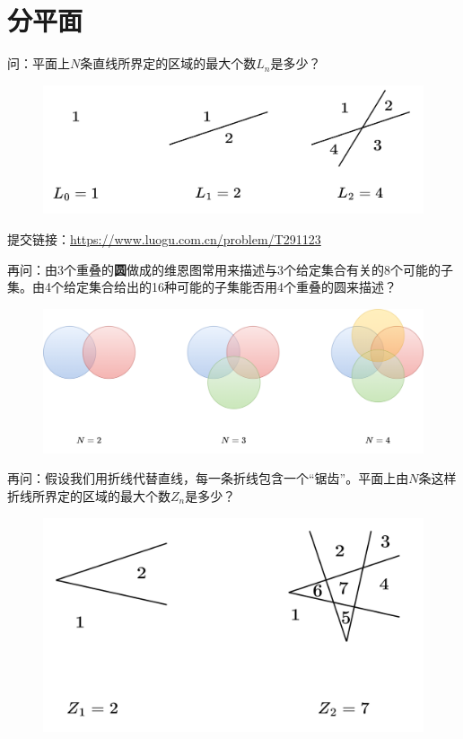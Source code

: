 \documentclass[12pt]{ctexart}
\begin{document}
\newpage
\section{分平面}
问：平面上$N$条直线所界定的区域的最大个数$L_n$是多少？

\begin{figure}[htbp]
    \centering
    \includegraphics[width=0.65\linewidth]{assets/2-0.png}
\end{figure}

提交链接：\url{https://www.luogu.com.cn/problem/T291123}\newline

再问：由3个重叠的\textbf{圆}做成的维恩图常用来描述与3个给定集合有关的8个可能的子集。由4个给定集合给出的16种可能的子集能否用4个重叠的圆来描述？

\begin{figure}[htbp]
    \centering
    \includegraphics[width=0.85\linewidth]{assets/2-1.png}
\end{figure}

再问：假设我们用折线代替直线，每一条折线包含一个“锯齿”。平面上由$N$条这样折线所界定的区域的最大个数$Z_n$是多少？\newline

\begin{figure}[htbp]
    \centering
    \includegraphics[width=0.55\linewidth]{assets/2-2.png}
\end{figure}
\end{document}
